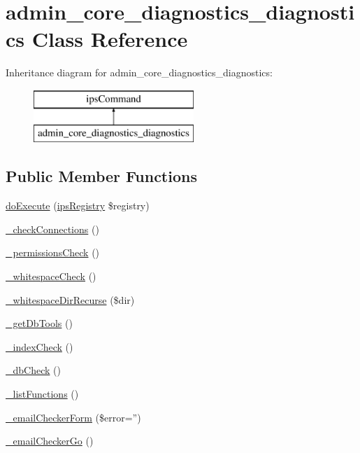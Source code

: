 \hypertarget{classadmin__core__diagnostics__diagnostics}{\section{admin\-\_\-core\-\_\-diagnostics\-\_\-diagnostics Class Reference}
\label{classadmin__core__diagnostics__diagnostics}
}
Inheritance diagram for admin\-\_\-core\-\_\-diagnostics\-\_\-diagnostics\-:\begin{figure}[H]
\begin{center}
\leavevmode
\includegraphics[height=2.000000cm]{classadmin__core__diagnostics__diagnostics}
\end{center}
\end{figure}
\subsection*{Public Member Functions}
\begin{DoxyCompactItemize}
\item 
\hyperlink{classadmin__core__diagnostics__diagnostics_afbc4e912a0604b94d47d66744c64d8ba}{do\-Execute} (\hyperlink{classips_registry}{ips\-Registry} \$registry)
\item 
\hyperlink{classadmin__core__diagnostics__diagnostics_a4bb24c962b7b87944d03b26180e2b4d5}{\-\_\-check\-Connections} ()
\item 
\hyperlink{classadmin__core__diagnostics__diagnostics_a2dafbdd7fbc74f28ef9a729f4890dd0d}{\-\_\-permissions\-Check} ()
\item 
\hyperlink{classadmin__core__diagnostics__diagnostics_ad3b0f56bc552ebe57f339f3dd14b9d5c}{\-\_\-whitespace\-Check} ()
\item 
\hyperlink{classadmin__core__diagnostics__diagnostics_abaced15cd99ed78dc606fda478b0f7e4}{\-\_\-whitespace\-Dir\-Recurse} (\$dir)
\item 
\hyperlink{classadmin__core__diagnostics__diagnostics_a8f4c0b1ad14268603b2a42771215eb8d}{\-\_\-get\-Db\-Tools} ()
\item 
\hyperlink{classadmin__core__diagnostics__diagnostics_aa321e2c6ad6dacb177b6a1502c0ab3e9}{\-\_\-index\-Check} ()
\item 
\hyperlink{classadmin__core__diagnostics__diagnostics_a0b1e359fca7c29ddcb9c5700643b886b}{\-\_\-db\-Check} ()
\item 
\hyperlink{classadmin__core__diagnostics__diagnostics_a5cbdc0746ab1d89a054f35a550a90bcf}{\-\_\-list\-Functions} ()
\item 
\hyperlink{classadmin__core__diagnostics__diagnostics_a1626e9bcb78ef33e94fd5601b274be22}{\-\_\-email\-Checker\-Form} (\$error='')
\item 
\hyperlink{classadmin__core__diagnostics__diagnostics_a6c640a99af429a884a1dbff33d8d577d}{\-\_\-email\-Checker\-Go} ()
\end{DoxyCompactItemize}

